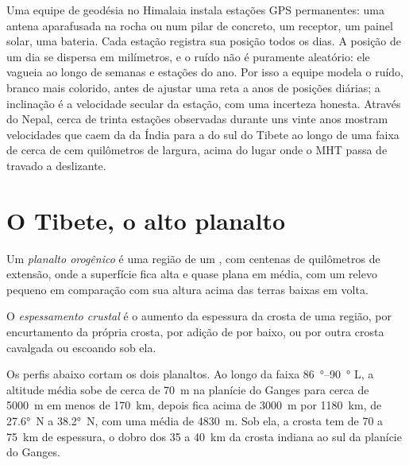 \begin{inthefield}
Uma equipe de geodésia no Himalaia instala estações GPS permanentes: uma antena aparafusada na rocha
ou num pilar de concreto, um receptor, um painel solar, uma bateria. Cada estação registra sua
posição todos os dias. A posição de um dia se dispersa em milímetros, e o ruído não é puramente
aleatório: ele vagueia ao longo de semanas e estações do ano. Por isso a equipe modela o ruído, branco mais
colorido, antes de ajustar uma reta a anos de posições diárias; a inclinação é a velocidade
secular da estação, com uma incerteza honesta. Através do Nepal, cerca de trinta estações
observadas durante uns vinte anos mostram velocidades que caem da da Índia para a do sul do Tibete
ao longo de uma faixa de cerca de cem quilômetros de largura, acima do lugar onde o MHT passa de travado
a deslizante.
\end{inthefield}

\section{O Tibete, o alto planalto}\label{sec:b2:himalaya-andes:tibet}

\begin{definition}\label{def:b2:himalaya-andes:plateau}
Um \emph{planalto orogênico} é uma região de um , com centenas de
quilômetros de extensão, onde a superfície fica alta e quase plana em média, com um relevo
pequeno em comparação com sua altura acima das terras baixas em volta.
\end{definition}

\begin{definition}\label{def:b2:himalaya-andes:thickening}
O \emph{espessamento crustal} é o aumento da espessura da
crosta de uma região, por encurtamento da própria crosta, por adição de  por baixo, ou por
outra crosta cavalgada ou escoando sob ela.
\end{definition}

Os perfis abaixo cortam os dois planaltos. Ao longo da faixa \qtyrange{86}{90}{\degree} L, a altitude
média sobe de cerca de \qty{70}{m} na planície do Ganges para cerca de \qty{5000}{m} em menos
de \qty{170}{km}, depois fica acima de \qty{3000}{m} por \qty{1180}{km}, de \ang{27.6}~N a
\ang{38.2}~N, com uma média de \qty{4830}{m}. Sob ela, a crosta tem de 70 a \qty{75}{km} de espessura,
o dobro dos 35 a \qty{40}{km} da crosta indiana ao sul da planície do Ganges.

